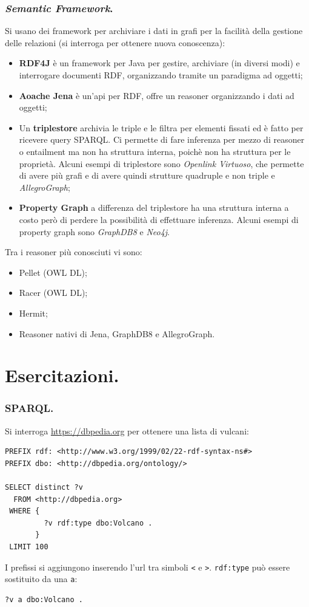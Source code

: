 \documentclass[11pt]{article}
\begin{document}
\section{\textit{Semantic Framework}.}
Si usano dei framework per archiviare i dati in grafi per la facilità della gestione delle relazioni (si interroga per ottenere nuova conoscenza):
\begin{itemize}
\item \textbf{RDF4J} è un framework per Java per gestire, archiviare (in diversi modi) e interrogare documenti RDF, organizzando tramite un paradigma ad oggetti;
\item \textbf{Aoache Jena} è un'api per RDF, offre un reasoner organizzando i dati ad oggetti;
\item Un \textbf{triplestore} archivia le triple e le filtra per elementi fissati ed è fatto per ricevere query SPARQL. Ci permette di fare inferenza per mezzo di reasoner o entailment ma non ha struttura interna, poichè non ha struttura per le proprietà. Alcuni esempi di triplestore sono \textit{Openlink Virtuoso}, che permette di avere più grafi e di avere quindi strutture quadruple e non triple e \textit{AllegroGraph};
\item \textbf{Property Graph} a differenza del triplestore ha una struttura interna a costo però di perdere la possibilità di effettuare inferenza. Alcuni esempi di property graph sono \textit{GraphDB8} e \textit{Neo4j}.
\end{itemize}
Tra i reasoner più conosciuti vi sono:
\begin{itemize}
\item Pellet (OWL DL);
\item Racer (OWL DL);
\item Hermit;
\item Reasoner nativi di Jena, GraphDB8 e AllegroGraph.
\end{itemize}
\newpage
\part{Esercitazioni.}

\section{SPARQL.}
Si interroga \url{https://dbpedia.org} per ottenere una lista di vulcani:
\begin{verbatim}
PREFIX rdf: <http://www.w3.org/1999/02/22-rdf-syntax-ns#>
PREFIX dbo: <http://dbpedia.org/ontology/>

SELECT distinct ?v
  FROM <http://dbpedia.org>
 WHERE {
         ?v rdf:type dbo:Volcano .
       }
 LIMIT 100
\end{verbatim}
I prefissi si aggiungono inserendo l'url tra simboli \verb|<| e \verb|>|.
\verb|rdf:type| può essere sostituito da una \verb|a|:
\begin{verbatim}
?v a dbo:Volcano .
\end{verbatim}
\end{document}
